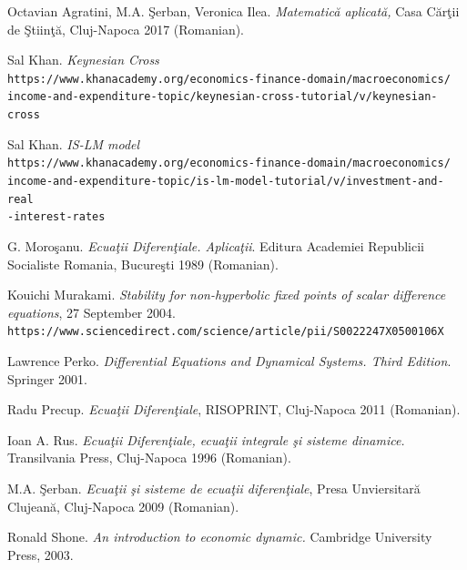 \documentclass[a4paper,11pt]{report}
\begin{document}
\begin{thebibliography}{9}

  Octavian Agratini, M.A. \c{S}erban, Veronica Ilea. \textit{Matematic\u{a} aplicat\u{a},} Casa C\u{a}r\c{t}ii de \c{S}tiin\c{t}\u{a}, Cluj-Napoca 2017 (Romanian). 

 Sal Khan. \textit{Keynesian Cross}
 \\\texttt{https://www.khanacademy.org/economics-finance-domain/macroeconomics/\\income-and-expenditure-topic/keynesian-cross-tutorial/v/keynesian-cross}
 
 Sal Khan. \textit{IS-LM model}
 \\\texttt{https://www.khanacademy.org/economics-finance-domain/macroeconomics/\\income-and-expenditure-topic/is-lm-model-tutorial/v/investment-and-real\\-interest-rates}
 
 G. Moro\c{s}anu. \textit{Ecua\c{t}ii Diferen\c{t}iale. Aplica\c{t}ii}. Editura Academiei Republicii Socialiste Romania, Bucure\c{s}ti 1989 (Romanian).
 
 Kouichi Murakami. \textit{Stability for non-hyperbolic fixed points of scalar difference equations}, 27 September 2004.
 \\\texttt{https://www.sciencedirect.com/science/article/pii/S0022247X0500106X}
 
 Lawrence Perko. \textit{Differential Equations and Dynamical Systems. Third Edition}. Springer 2001.
 
 Radu Precup. \textit{Ecua\c{t}ii Diferen\c{t}iale}, RISOPRINT, Cluj-Napoca 2011 (Romanian).
 
 Ioan A. Rus. \textit{Ecua\c{t}ii Diferen\c{t}iale, ecua\c{t}ii integrale \c{s}i sisteme dinamice.} Transilvania Press, Cluj-Napoca 1996 (Romanian).

  M.A. \c{S}erban. \textit{Ecua\c{t}ii \c{s}i sisteme de ecua\c{t}ii diferen\c{t}iale}, Presa Unviersitar\u{a} Clujean\u{a}, Cluj-Napoca 
  2009 (Romanian).
  
 
 Ronald Shone. \textit{An introduction to economic dynamic.} Cambridge University Press, 2003.


\end{thebibliography}
\end{document}
